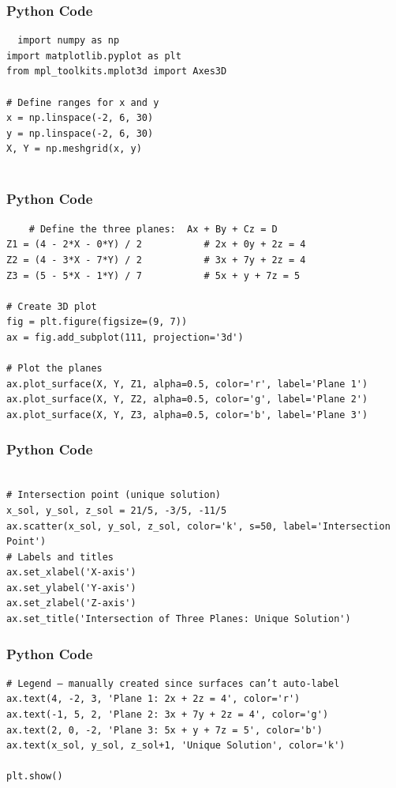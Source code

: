 \documentclass{beamer}
\begin{document}
\begin{frame}[fragile]
\frametitle{Python Code}
\begin{lstlisting}
  import numpy as np
import matplotlib.pyplot as plt
from mpl_toolkits.mplot3d import Axes3D

# Define ranges for x and y
x = np.linspace(-2, 6, 30)
y = np.linspace(-2, 6, 30)
X, Y = np.meshgrid(x, y)
  
\end{lstlisting}
\end{frame}
\begin{frame}[fragile]
\frametitle{Python Code}
\begin{lstlisting}
    # Define the three planes:  Ax + By + Cz = D
Z1 = (4 - 2*X - 0*Y) / 2           # 2x + 0y + 2z = 4
Z2 = (4 - 3*X - 7*Y) / 2           # 3x + 7y + 2z = 4
Z3 = (5 - 5*X - 1*Y) / 7           # 5x + y + 7z = 5

# Create 3D plot
fig = plt.figure(figsize=(9, 7))
ax = fig.add_subplot(111, projection='3d')

# Plot the planes
ax.plot_surface(X, Y, Z1, alpha=0.5, color='r', label='Plane 1')
ax.plot_surface(X, Y, Z2, alpha=0.5, color='g', label='Plane 2')
ax.plot_surface(X, Y, Z3, alpha=0.5, color='b', label='Plane 3')
\end{lstlisting}
\end{frame}
\begin{frame}[fragile]
\frametitle{Python Code}
\begin{lstlisting}

# Intersection point (unique solution)
x_sol, y_sol, z_sol = 21/5, -3/5, -11/5
ax.scatter(x_sol, y_sol, z_sol, color='k', s=50, label='Intersection Point')
# Labels and titles
ax.set_xlabel('X-axis')
ax.set_ylabel('Y-axis')
ax.set_zlabel('Z-axis')
ax.set_title('Intersection of Three Planes: Unique Solution')

\end{lstlisting}
\end{frame}
\begin{frame}[fragile]
\frametitle{Python Code}
\begin{lstlisting}
# Legend — manually created since surfaces can’t auto-label
ax.text(4, -2, 3, 'Plane 1: 2x + 2z = 4', color='r')
ax.text(-1, 5, 2, 'Plane 2: 3x + 7y + 2z = 4', color='g')
ax.text(2, 0, -2, 'Plane 3: 5x + y + 7z = 5', color='b')
ax.text(x_sol, y_sol, z_sol+1, 'Unique Solution', color='k')

plt.show()

\end{lstlisting}
\end{frame}
\end{document}
